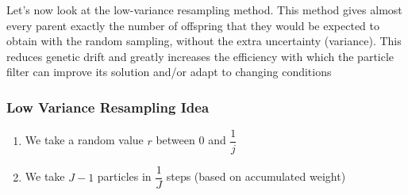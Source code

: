\begin{frame}
\begin{itemize}
{        Let's now look at the low-variance resampling method. This method gives almost every parent exactly the number of offspring that they would be expected to obtain with the random sampling, without the extra uncertainty (variance). This reduces genetic drift and greatly increases the efficiency with which the particle filter can improve its solution and/or adapt to changing conditions 
        } 
        
    \end{itemize}
\end{frame}

\begin{frame} 
    \frametitle{Low Variance Resampling Idea} 
    
    \begin{center} 
    \end{center} 
    
    \begin{enumerate} 
        \item<1-> We take a random value $r$ between 0 and $\dfrac{1}{j}$ 
        \item<2> We take $J-1$ particles in $\dfrac{1}{J}$ steps (based on accumulated weight) 
    \end{enumerate}
    
\end{frame}

